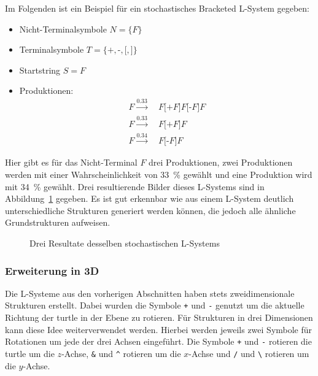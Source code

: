 Im Folgenden ist ein Beispiel für ein stochastisches Bracketed L-System gegeben:
\begin{itemize}
    \item Nicht-Terminalsymbole $N=\{F\}$
    \item Terminalsymbole $T=\{\texttt{+},\texttt{-},\texttt{[},\texttt{]}\}$
    \item Startstring $S=F$
    \item Produktionen:
    \begin{align*}
        F\xrightarrow{0.33} & ~F\texttt{[+}F\texttt{]}F\texttt{[-}F\texttt{]} F \\
        F\xrightarrow{0.33} & ~F\texttt{[+}F\texttt{]} F                         \\
        F\xrightarrow{0.34} & ~F\texttt{[-}F\texttt{]} F
    \end{align*}
\end{itemize}

Hier gibt es für das Nicht-Terminal $F$ drei Produktionen, zwei Produktionen werden mit einer Wahrscheinlichkeit von \SI{33}{\percent} gewählt und eine Produktion wird mit \SI{34}{\percent} gewählt.
Drei resultierende Bilder dieses L-Systems sind in Abbildung~\ref{fig:Stochastic} gegeben.
Es ist gut erkennbar wie aus einem L-System deutlich unterschiedliche Strukturen generiert werden können, die jedoch alle ähnliche Grundstrukturen aufweisen.
\begin{figure}[ht]
   \begin{subfigure}[t]{.25\textwidth}
       \centering
       
   \end{subfigure}
   \hfill
   \begin{subfigure}[t]{.25\textwidth}
       \centering
       
   \end{subfigure}
   \hfill
   \begin{subfigure}[t]{.25\textwidth}
       \centering
       
   \end{subfigure}
   \caption{Drei Resultate desselben stochastischen L-Systems}\label{fig:Stochastic}
\end{figure}


\subsubsection{Erweiterung in 3D}\label{subsub: L-System 3D}
Die L-Systeme aus den vorherigen Abschnitten haben stets zweidimensionale Strukturen erstellt.
Dabei wurden die Symbole \texttt{+} und \texttt{-} genutzt um die aktuelle Richtung der turtle in der Ebene zu rotieren.
Für Strukturen in drei Dimensionen kann diese Idee weiterverwendet werden.
Hierbei werden jeweils zwei Symbole für Rotationen um jede der drei Achsen eingeführt.
Die Symbole \texttt{+} und \texttt{-} rotieren die turtle um die $z$-Achse, \texttt{\&} und \texttt{\textasciicircum} rotieren um die $x$-Achse und \texttt{/} und \texttt{\textbackslash} rotieren um die $y$-Achse.

